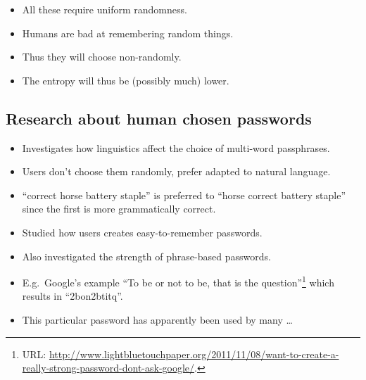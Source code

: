 \begin{frame}
  \begin{remark}
    \begin{itemize}
      \item All these require uniform randomness.
      \item Humans are bad at remembering random things.
      \item Thus they will choose non-randomly.
      \item The entropy will thus be (possibly much) lower.
    \end{itemize}
  \end{remark}
\end{frame}

\subsection{Research about human chosen passwords}

\begin{frame}
  \begin{example}
    \begin{itemize}
      \item Investigates how linguistics affect the choice of multi-word 
        passphrases.

      \item Users don't choose them randomly, prefer adapted to natural 
        language.

      \item \enquote{correct horse battery staple} is preferred to 
        \enquote{horse correct battery staple} since the first is more 
        grammatically correct.
    \end{itemize}
  \end{example}
\end{frame}

\begin{frame}
  \begin{example}
    \begin{itemize}
      \item Studied how users creates easy-to-remember passwords.

      \item Also investigated the strength of phrase-based passwords.

      \item E.g.\ Google's example \enquote{To be or not to be, that is the 
          question}\footnote{%
          URL\@: 
          \protect\url{http://www.lightbluetouchpaper.org/2011/11/08/want-to-create-a-really-strong-password-dont-ask-google/}.
        } which results in \enquote{2bon2btitq}.

      \item This particular password has apparently been used by many \dots
    \end{itemize}
  \end{example}
\end{frame}

